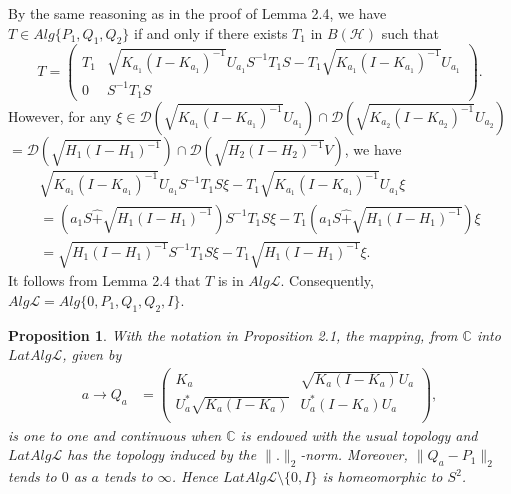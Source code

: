 \documentclass[12pt]{article}
\newtheorem{prop}{Proposition}[section]
\newcommand{\DDD}{\mathcal D}
\newcommand{\HHH}{\mathcal H} %
\newcommand{\LLL}{\mathcal L} %
\newcommand{\C}{\mathbb C} %
\def\L{{\mathcal{L}}}
\begin{document}
{By the same reasoning as in the proof of Lemma 2.4, we have $T \in Alg\{P_1,Q_1,Q_2\}$ if and only if 
there exists $T_1$ in $B(\HHH)$ such that
$$T=\left(\begin{array}{cc} T_1 & \sqrt{K_{a_1}(I-K_{a_1})^{-1}}U_{a_1}S^{-1}T_1 S-T_1\sqrt{K_{a_1}(I-K_{a_1})^{-1}}U_{a_1}\\
0 & S^{-1}T_1 S\end{array}\right).$$ 
However, for any $\xi \in \DDD(\sqrt{K_{a_1}(I-K_{a_1})^{-1}}U_{a_1}) \cap \DDD(\sqrt{K_{a_2}(I-K_{a_2})^{-1}}U_{a_2})$\\  
$= \DDD(\sqrt{H_1(I-H_{1})^{-1}}) \cap  \DDD(\sqrt{H_2(I-H_{2})^{-1}}V)$, we have 
$$\begin{array}{l} 
 \sqrt{K_{a_1}(I-K_{a_1})^{-1}}U_{a_1}S^{-1}T_1 S\xi -T_1\sqrt{K_{a_1}(I-K_{a_1})^{-1}}U_{a_1}\xi\\
=(a_1S\widehat{+} \sqrt{H_1(I-H_1)^{-1}})S^{-1}T_1S\xi- T_1 (a_1S \widehat{+} \sqrt{H_1(I-H_1)^{-1}})\xi\\
=\sqrt{H_1(I-H_1)^{-1}}S^{-1}T_1S\xi-T_1\sqrt{H_1(I-H_1)^{-1}}\xi.\end{array}$$
It follows from Lemma 2.4 that $T$ is in $ Alg\L$.
Consequently, $Alg\LLL =  Alg\{0,P_1, Q_1, Q_2, I\}$.
\vspace{2mm}

\begin{prop}
With the notation in Proposition 2.1, the mapping, from $\C$ into $LatAlg\LLL$,
given by
\begin{align*} a \rightarrow Q_{a} &=
\left(
          \begin{array}{cc}
            K_{a} & \sqrt{K_{a}(I-K_{a})}U_{a} \\
            U_{a}^{*}\sqrt{K_{a}(I-K_{a})} & U_{a}^{*}(I-K_{a})U_{a} \\
          \end{array}
        \right),
\end{align*}
is one to one and continuous when $\C$ is endowed with the usual topology and
$LatAlg\LLL$ has the topology induced by the $\|.\|_{2}$-norm. Moreover, $\| Q_{a} - P_1 \|_{2}
$ tends to $0$ as $a$ tends to $\infty$. Hence $LatAlg\LLL\setminus\{0,I\}$ is homeomorphic
to $S^2$.
\end{prop}

}
\end{document}
